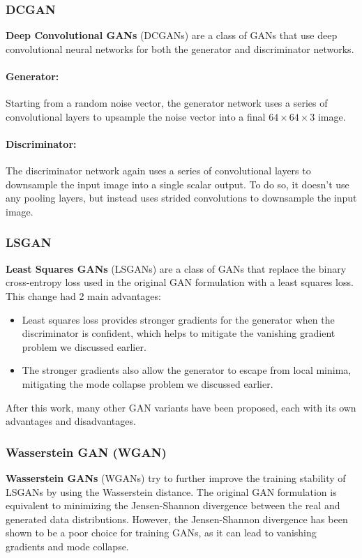 \subsubsection{DCGAN}
\textbf{Deep Convolutional GANs} (DCGANs) are a class of GANs that use deep convolutional neural networks for both the generator and discriminator networks.

\paragraph{Generator:} Starting from a random noise vector, the generator network uses a series of convolutional layers to upsample the noise vector into a
final $64 \times 64 \times 3$ image.

\paragraph{Discriminator:} The discriminator network again uses a series of convolutional layers  to downsample the input image into a single scalar output.
To do so, it doesn't use any pooling layers, but instead uses strided convolutions to downsample the input image.

\subsubsection{LSGAN}
\textbf{Least Squares GANs} (LSGANs) are a class of GANs that replace the binary cross-entropy loss used in the original GAN formulation with a least squares loss.
This change had 2 main advantages:
\begin{itemize}
    \item Least squares loss provides stronger gradients for the generator when the discriminator is confident, which helps to mitigate the vanishing gradient problem
    we discussed earlier.
    \item The stronger gradients also allow the generator to escape from local minima, mitigating the mode collapse problem we discussed earlier.
\end{itemize}

After this work, many other GAN variants have been proposed, each with its own advantages and disadvantages.

\subsubsection{Wasserstein GAN (WGAN)}
\textbf{Wasserstein GANs} (WGANs) try to further improve the training stability of LSGANs by using the Wasserstein distance. 
The original GAN formulation is equivalent to minimizing the Jensen-Shannon divergence between the real and generated data distributions.
However, the Jensen-Shannon divergence has been shown to be a poor choice for training GANs, as it can lead to vanishing gradients and mode collapse.

